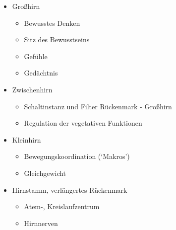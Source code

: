 {

\begin{itemize}
  \item Großhirn
  \begin{itemize}
    \item Bewusstes Denken
    \item Sitz des Bewusstseins
    \item Gefühle
    \item Gedächtnis
  \end{itemize}
  \item Zwischenhirn
  \begin{itemize}
    \item Schaltinstanz und Filter Rückenmark - Großhirn
    \item Regulation der vegetativen Funktionen
  \end{itemize}
  \item Kleinhirn
  \begin{itemize}
    \item Bewegungskoordination (\enquote*{Makros})
    \item Gleichgewicht
  \end{itemize}
  \item Hirnstamm, verlängertes Rückenmark
  \begin{itemize}
    \item Atem-, Kreislaufzentrum
    \item Hirnnerven
  \end{itemize}
\end{itemize}

}


